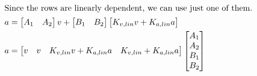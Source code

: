 \begin{align*}
  \intertext{Since the rows are linearly dependent, we can use just one of
    them.}
  a &=
    \begin{bmatrix}
      A_1 & A_2
    \end{bmatrix} v +
    \begin{bmatrix}
      B_1 & B_2
    \end{bmatrix}
    \begin{bmatrix}
      K_{v,lin} v + K_{a,lin} a
    \end{bmatrix} \\
  a &=
    \begin{bmatrix}
      v & v & K_{v,lin} v + K_{a,lin} a & K_{v,lin} + K_{a,lin} a
    \end{bmatrix}
    \begin{bmatrix}
      A_1 \\
      A_2 \\
      B_1 \\
      B_2
    \end{bmatrix}
\end{align*}

